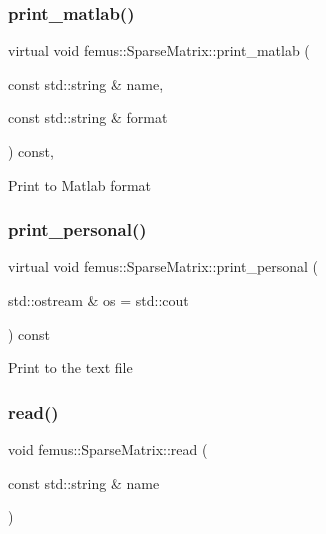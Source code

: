 \subsubsection{\texorpdfstring{print\+\_\+matlab()}{print\_matlab()}}
{\footnotesize\ttfamily virtual void femus\+::\+Sparse\+Matrix\+::print\+\_\+matlab (\begin{DoxyParamCaption}\item[{const std\+::string \&}]{name,  }\item[{const std\+::string \&}]{format }\end{DoxyParamCaption}) const\hspace{0.3cm}{\ttfamily [inline]}, {\ttfamily [virtual]}}

Print to Matlab format \mbox{\label{classfemus_1_1_sparse_matrix_a6ce1f4c72f660467a2dee9293c8808ac}} 
\subsubsection{\texorpdfstring{print\+\_\+personal()}{print\_personal()}}
{\footnotesize\ttfamily virtual void femus\+::\+Sparse\+Matrix\+::print\+\_\+personal (\begin{DoxyParamCaption}\item[{std\+::ostream \&}]{os = {\ttfamily std\+:\+:cout} }\end{DoxyParamCaption}) const\hspace{0.3cm}{\ttfamily [pure virtual]}}

Print to the text file \mbox{\label{classfemus_1_1_sparse_matrix_a93ef51c0dc6cbbe2aa62e1256749d7c6}} 
\subsubsection{\texorpdfstring{read()}{read()}}
{\footnotesize\ttfamily void femus\+::\+Sparse\+Matrix\+::read (\begin{DoxyParamCaption}\item[{const std\+::string \&}]{name }\end{DoxyParamCaption})}

